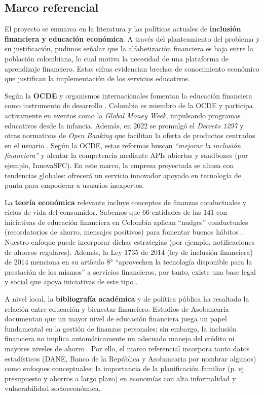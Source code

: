 {}
\subsection*{Marco referencial}
El proyecto se enmarca en la literatura y las políticas actuales de \textbf{inclusión financiera y educación económica}. A través del planteamiento del problema y su justificación, pudimos señalar que la alfabetización financiera es baja entre la población colombiana, lo cual motiva la necesidad de una plataforma de aprendizaje financiero. Estas cifras evidencian brechas de conocimiento económico que justifican la implementación de los servicios educativos.

Según la \textbf{OCDE} y organismos internacionales fomentan la educación financiera como instrumento de desarrollo \parencite{OECD02}. Colombia es miembro de la OCDE y participa activamente en eventos como la \textit{Global Money Week}, impulsando programas educativos desde la infancia. Además, en 2022 se promulgó el \textit{Decreto 1297} y otras normativas de \textit{Open Banking} que facilitan la oferta de productos centrados en el usuario \parencite{Decreto1297}. Según la OCDE, estas reformas buscan \textit{``mejorar la inclusión financiera''} y alentar la competencia mediante APIs abiertas y sandboxes (por ejemplo, InnovaSFC). En este marco, la empresa proyectada se alinea con tendencias globales: ofrecerá un servicio innovador apoyado en tecnología de punta para empoderar a usuarios inexpertos.

La \textbf{teoría económica} relevante incluye conceptos de finanzas conductuales y ciclos de vida del consumidor. Sabemos que 66 entidades de las 141 con iniciativas de educación financiera en Colombia aplican ``nudges'' conductuales (recordatorios de ahorro, mensajes positivos) para fomentar buenos hábitos \parencite{ColombiaFintech01}. Nuestro enfoque puede incorporar dichas estrategias (por ejemplo, notificaciones de ahorros regulares). Además, la Ley 1735 de 2014 (ley de inclusión financiera) de 2014 menciona en su artículo 8° ``aprovechen la tecnología disponible para la prestación de los mismos'' a servicios financieros, por tanto, existe una base legal y social que apoya iniciativas de este tipo \parencite{Ley1735}.

A nivel local, la \textbf{bibliografía académica} y de política pública ha resaltado la relación entre educación y bienestar financiero. Estudios de Asobancaria documentan que un mayor nivel de educación financiera juega un papel fundamental en la gestión de finanzas personales; sin embargo, la inclusión financiera no implica automáticamente un adecuado manejo del crédito ni mayores niveles de ahorro \parencite[p. 1, 8-9]{Asobancaria02}. Por ello, el marco referencial incorpora tanto datos estadísticos (DANE, Banco de la República y Asobancaria por nombrar algunos) como enfoques conceptuales: la importancia de la planificación familiar (p. ej. presupuesto y ahorros a largo plazo) en economías con alta informalidad y vulnerabilidad socioeconómica.

